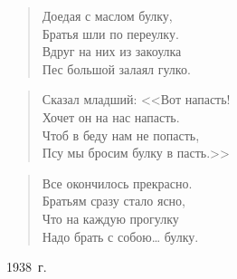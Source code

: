

\vspace{0.3cm}

\begin{verse}
\hspace{3.2cm}Доедая с маслом булку,\\
\hspace{3.2cm}Братья шли по переулку.\\
\hspace{3.2cm}Вдруг на них из закоулка\\
\hspace{3.2cm}Пес большой залаял гулко.
\end{verse}

\vspace{0.5cm}

\begin{verse}
\hspace{4.2cm}Сказал младший: <<Вот напасть!\\
\hspace{4.2cm}Хочет он на нас напасть.\\
\hspace{4.2cm}Чтоб в беду нам не попасть,\\
\hspace{4.2cm}Псу мы бросим булку в пасть.>>
\end{verse}

\vspace{0.5cm}

\begin{verse}
\hspace{3.2cm}Все окончилось прекрасно.\\
\hspace{3.2cm}Братьям сразу стало ясно,\\
\hspace{3.2cm}Что на каждую прогулку\\
\hspace{3.2cm}Надо брать с собою\dots{} булку.
\end{verse}

\begin{flushright}
1938~г.
\end{flushright}